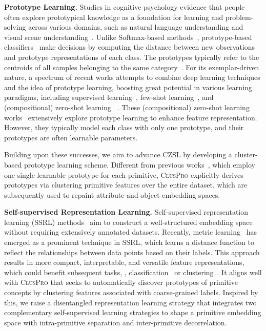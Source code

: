 \noindent\textbf{Prototype Learning.} Studies in cognitive psychology evidence that people often explore prototypical knowledge as a foundation for learning and problem-solving across various domains, such as natural language understanding and visual scene understanding~\cite{aamodt1994case,yang2021multiple}.
Unlike Softmax-based methods~\cite{he2016deep,liu2021swin,simonyan2014very}, prototype-based classifiers~\cite{cover1967nearest,garcia2012prototype,goldberger2004neighbourhood,he2005neighborhood} make decisions by computing the distance between new observations and prototype representations of each class. 
The prototypes typically refer to the centroids of all samples belonging to the same category~\cite{snell2017prototypical}. 
For its exemplar-driven nature, a spectrum of recent works attempts to combine deep learning techniques and the idea of prototype learning, boosting great potential in various learning paradigms, including supervised learning~\cite{zhou2022rethinking,feng2023clustering,qin2023unified,ding2024clustering,liang2023clustseg,wang2024visual}, few-shot learning~\cite{hou2022closer,zhu2023transductive}, and (compositional) zero-shot learning ~\cite{xu2020attribute,ruis2021independent,hu2023leveraging}.  These (compositional) zero-shot learning works~\cite{wang2021dual,hou2024visual,chen2023protoclip,xu2020attribute} extensively explore prototype learning to enhance feature representation. However, they typically model each class with only one prototype, and their prototypes are often learnable parameters.

Building upon these successes, we aim to advance CZSL by developing a cluster-based prototype learning scheme. 
Different from previous works~\cite{li2022siamese,ruis2021independent}, which employ one single learnable prototype for each primitive, \textsc{ClusPro} explicitly derives prototypes via clustering primitive features over the entire dataset, which are subsequently used to repaint attribute and object embedding spaces.

\noindent\textbf{Self-supervised Representation Learning.} 
Self-supervised representation learning (SSRL) methods~\cite{jing2020self,ericsson2022self,liang2022gmmseg} aim to construct a well-structured embedding space without requiring extensively annotated datasets.
Recently, metric learning~\cite{kaya2019deep} has emerged as a prominent technique in SSRL, which learns a distance function to reflect the relationships between data points based on their labels.
This approach results in more compact, interpretable, and versatile feature representations, which could benefit subsequent tasks, \eg, classification~\cite{zhai2018classification,chen2024neural,liang2024clusterfomer} or clustering~\cite{asano2019self,quan2024clustering}.
It aligns well with \textsc{ClusPro} that seeks to automatically discover prototypes of primitive concepts by clustering features associated with coarse-grained labels.
Inspired by this, we raise a disentangled representation learning strategy that integrates two complementary self-supervised learning strategies to shape a primitive embedding space with intra-primitive separation and inter-primitive decorrelation.